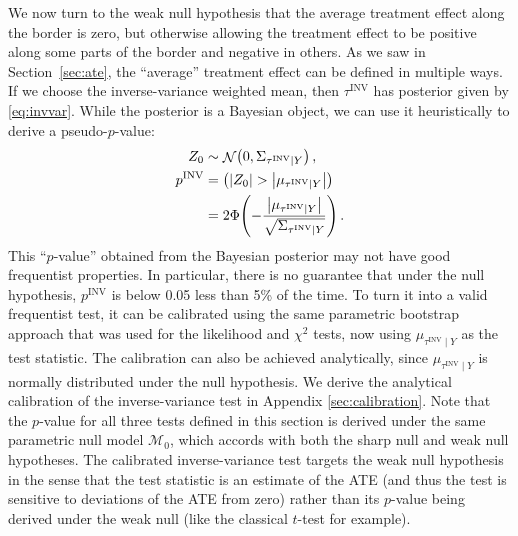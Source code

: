 \documentclass[letter,12pt]{article}
\DeclarePairedDelimiter{\parenthesis}{\lparen}{\rparen}
\DeclarePairedDelimiter{\absolutevalue}{\lvert}{\rvert}
\newcommand{\del}[1]{\parenthesis*{#1}}
\newcommand{\abs}[1]{\absolutevalue*{#1}}
\let\Pr\relax
\DeclareMathOperator{\Pr}{\mathbb{P}}
\DeclareMathOperator{\normal}{\mathcal{N}}
\newcommand{\invvar}{\tau^{\mathrm{INV}}}
\newcommand{\modnull}{\mathscr{M}_0}
\begin{document}
We now turn to the weak null hypothesis that the average treatment effect along the border is zero, but otherwise allowing the treatment effect to be positive along some parts of the border and negative in others.
As we saw in Section~\ref{sec:ate}, the ``average'' treatment effect can be defined in multiple ways.
If we choose the inverse-variance weighted mean, then \(\invvar\) has posterior given by \eqref{eq:invvar}.
While the posterior is a Bayesian object, we can use it heuristically to derive a pseudo-\(p\)-value:
\begin{equation}
    \begin{split}
        Z_0 &\sim \normal\del{0, \Sigma_{\invvar \mid Y}} \,, \\
        p^{\mathrm{INV}} &= \Pr\del{ 
            \abs{Z_0} > 
            \abs{
                \mu_{
                    \invvar \mid Y
                }
            } 
        } \\
        &= 2\Phi\del{-
        \frac{
            \abs{
                \mu_{
                    \invvar \mid Y
                }
            }
            }{
            \sqrt{
                \Sigma_{\invvar \mid Y}
            }
        }
    } \,.
\end{split}
\end{equation}
This ``\(p\)-value'' obtained from the Bayesian posterior may not have good frequentist properties.
In particular, there is no guarantee that under the null hypothesis, \(p^{\mathrm{INV}}\) is below 0.05 less than 5\% of the time.
To turn it into a valid frequentist test, it can be calibrated using the same parametric bootstrap approach that was used for the likelihood and \(\chi^2\) tests, now using \(\mu_{\invvar \mid Y}\) as the test statistic.
The calibration can also be achieved analytically, since \(\mu_{\invvar \mid Y}\) is normally distributed under the null hypothesis.
We derive the analytical calibration of the inverse-variance test in Appendix \ref{sec:calibration}.
Note that the \(p\)-value for all three tests defined in this section is derived under the same parametric null model \(\modnull\), which accords with both the sharp null and weak null hypotheses.
The calibrated inverse-variance test targets the weak null hypothesis in the sense that the test statistic is an estimate of the ATE (and thus the test is sensitive to deviations of the ATE from zero) rather than its \(p\)-value being derived under the weak null (like the classical \(t\)-test for example).

\label{eq:calib_test}
\end{document}
